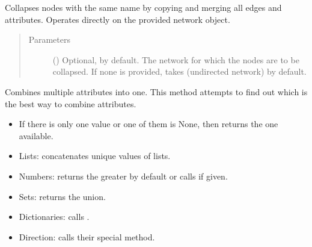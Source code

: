 \documentclass[letterpaper,10pt,english]{sphinxmanual}
\begin{document}
\begin{fulllineitems}
\begin{fulllineitems}
\label{\detokenize{reference:pypath.main.PyPath.collapse_by_name}}
Collapses nodes with the same name by copying and merging
all edges and attributes. Operates directly on the provided
network object.
\begin{quote}\begin{description}
\item[{Parameters}] \leavevmode
{} () \textendash{} Optional,  by default. The network for which the
nodes are to be collapsed. If none is provided, takes
 (undirected network) by
default.

\end{description}\end{quote}

\end{fulllineitems}


\begin{fulllineitems}
\label{\detokenize{reference:pypath.main.PyPath.combine_attr}}
Combines multiple attributes into one. This method attempts
to find out which is the best way to combine attributes.
\begin{itemize}
\item {} 
If there is only one value or one of them is None, then
returns the one available.

\item {} 
Lists: concatenates unique values of lists.

\item {} 
Numbers: returns the greater by default or calls
 if given.

\item {} 
Sets: returns the union.

\item {} 
Dictionaries: calls .

\item {} 
Direction: calls their special
{\hyperref[\detokenize{reference:pypath.main.Direction.merge}]{}} method.


\end{itemize}
\end{fulllineitems}
\end{fulllineitems}
\end{document}
